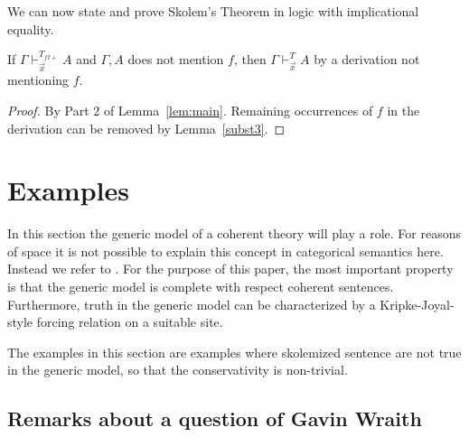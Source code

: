 \documentclass[10pt,a4paper]{article}
\begin{document}
We can now state and prove Skolem's Theorem in logic with implicational equality.

\begin{theorem}\label{thm:skolemwith=}
If $\Gamma\vdash_{\vec{x}}^{T_{f\!I\!{+}}} A$ and $\Gamma,A$ does not mention $f$,
then $\Gamma\vdash_{\vec{x}}^{T} A$ by a derivation not mentioning $f$.
\end{theorem}
\begin{proof}
By Part 2 of Lemma~\ref{lem:main}. Remaining occurrences of $f$
in the derivation can be removed by Lemma~\ref{subst3}.
\end{proof}

\section{Examples}

In this section the generic model of a coherent theory will play a role.
For reasons of space it is not possible to explain this concept
in categorical semantics here. Instead we refer to \cite{MLM}.
For the purpose of this paper, the most important property is that 
the generic model is complete with respect coherent sentences.
Furthermore, truth in the generic model can be characterized
by a Kripke-Joyal-style forcing relation on a suitable site.

The examples in this section are examples where 
skolemized sentence are not true in the generic model,
so that the conservativity is non-trivial.

\subsection{Remarks about a question of Gavin Wraith}
\end{document}

